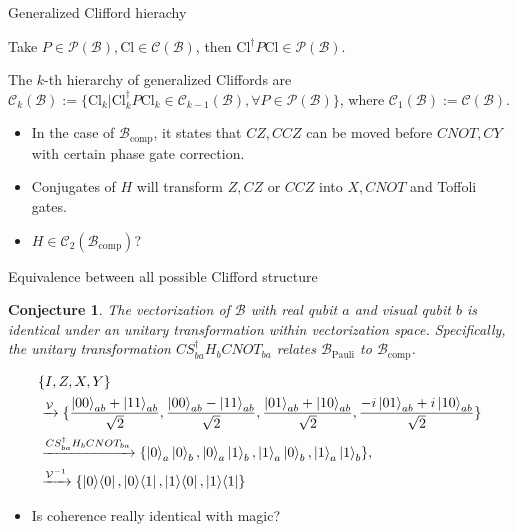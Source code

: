 \documentclass{beamer}
\newtheorem{conjecture}{Conjecture}
\begin{document}
\begin{frame}{Generalized Clifford hierachy}
    \begin{lemma}
     Take $P \in \mathcal{P}(\mathcal{B}), \text{Cl} \in \mathcal{C}(\mathcal{B})$, then $\text{Cl}^\dagger P\text{Cl} \in \mathcal{P}(\mathcal{B})$.
\end{lemma}
 
\begin{definition}
     The $k$-th hierarchy of generalized Cliffords are  $\mathcal{C}_{k}(\mathcal{B}):=\{\text{Cl}_k|\text{Cl}_k^\dagger P\text{Cl}_k \in \mathcal{C}_{k-1}(\mathcal{B}), \forall P \in \mathcal{P}(\mathcal{B}) \}$, where $\mathcal{C}_{1}(\mathcal{B}) := \mathcal{C}(\mathcal{B})$.
\end{definition}
\begin{itemize}
    \item In the case of $\mathcal{B}_{\text{comp}}$, it states that $CZ,CCZ$ can be moved before $CNOT,CY$ with certain phase gate correction.
    \item Conjugates of $H$ will transform $Z,CZ$ or $CCZ$ into $X,CNOT$ and Toffoli gates.
    \item \color{red} $H \in \mathcal{C}_2(\mathcal{B}_{\text{comp}})$? \color{black}
\end{itemize}
\end{frame}
\begin{frame}{Equivalence between all possible Clifford structure}
    \begin{conjecture}
         The vectorization of $\mathcal{B}$ with real qubit $a$ and visual qubit $b$ is identical under an unitary transformation within vectorization space.
         Specifically, the unitary transformation $CS_{ba}^\dagger H_bCNOT_{ba}$ relates $\mathcal{B}_{\text{Pauli}}$ to $\mathcal{B}_{\text{comp}}$. 
    \end{conjecture}
        \begin{align*}
    &\{I,Z,X,Y\} \\
    &\xrightarrow{\mathcal{V}}\{\frac{\ket{00}_{ab}+\ket{11}_{ab}}{\sqrt{2}},\frac{\ket{00}_{ab}-\ket{11}_{ab}}{\sqrt{2}},\frac{\ket{01}_{ab}+\ket{10}_{ab}}{\sqrt{2}},\frac{-i\ket{01}_{ab}+i\ket{10}_{ab}}{\sqrt{2}}\}\\
    &\xrightarrow{CS_{ba}^\dagger H_bCNOT_{ba}}\{\ket{0}_a\ket{0}_b, \ket{0}_a\ket{1}_b, \ket{1}_a\ket{0}_b,\ket{1}_a\ket{1}_b\},\\
    &\xrightarrow{\mathcal{V}^{-1}}\{\ket{0}\!\bra{0}, \ket{0}\!\bra{1}, \ket{1}\!\bra{0},\ket{1}\!\bra{1}\}
\end{align*}
    \begin{itemize}
        \item Is coherence really identical with magic?
    \end{itemize}
\end{frame}
\end{document}
